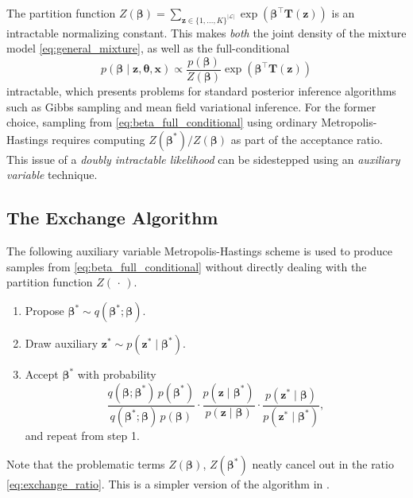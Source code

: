 \documentclass[12pt]{article}
\newcommand{\LL}{\mathcal{L}}
\begin{document}
The partition function $Z(\bm\beta) = \sum_{\bm{z} \in \{1, \dots, K\}^{|\LL|}}
\exp(\bm\beta^\top \bm{T}(\bm{z}))$ is an intractable normalizing constant.
This makes \emph{both} the joint density of the mixture model
\eqref{eq:general_mixture}, as well as the full-conditional
\begin{equation}
\label{eq:beta_full_conditional}
    p(\bm\beta \mid \bm{z}, \bm{\theta}, \bm{x})
        \propto \frac{p(\bm\beta)}{Z(\bm\beta)} \exp(\bm\beta^\top \bm{T}(\bm{z}))
\end{equation}
intractable, which presents problems for standard posterior inference
algorithms such as Gibbs sampling and mean field variational inference.
For the former choice, sampling from \eqref{eq:beta_full_conditional} using
ordinary Metropolis-Hastings requires computing $Z(\bm\beta^*)/Z(\bm\beta)$ as
part of the acceptance ratio.
This issue of a \emph{doubly intractable likelihood} can be sidestepped using
an \emph{auxiliary variable} technique.



\subsection{The Exchange Algorithm}
\label{sec:exchange_algorithm}

The following auxiliary variable Metropolis-Hastings scheme \citep{murray2006}
is used to produce samples from \eqref{eq:beta_full_conditional} without
directly dealing with the partition function $Z(\,\cdot\,)$.
\begin{enumerate}[itemsep=-0.7em]
    \item Propose $\bm{\beta}^* \sim q(\bm{\beta}^*; \bm{\beta})$.
    \item Draw auxiliary $\bm{z}^* \sim p(\bm{z}^* \mid \bm{\beta}^*)$.
    \item Accept $\bm{\beta}^*$ with probability
    \begin{equation}
    \label{eq:exchange_ratio}
        \frac{
            q(\bm{\beta}; \bm{\beta}^*)\,
            p(\bm{\beta}^*)
        }{
            q(\bm{\beta}^*; \bm{\beta})\,
            p(\bm{\beta})
        }\cdot \frac{
            p(\bm{z} \mid \bm{\beta}^*)
        }{
            p(\bm{z} \mid \bm{\beta})
        }\cdot \frac{
            p(\bm{z}^*\mid \bm{\beta})
        }{
            p(\bm{z}^* \mid \bm{\beta}^*)
        },
    \end{equation}
    and repeat from step 1.
\end{enumerate}
Note that the problematic terms $Z(\bm\beta)$, $Z(\bm\beta^*)$ neatly cancel
out in the ratio \eqref{eq:exchange_ratio}.
This is a simpler version of the algorithm in \citet{moller2006}.
\end{document}
